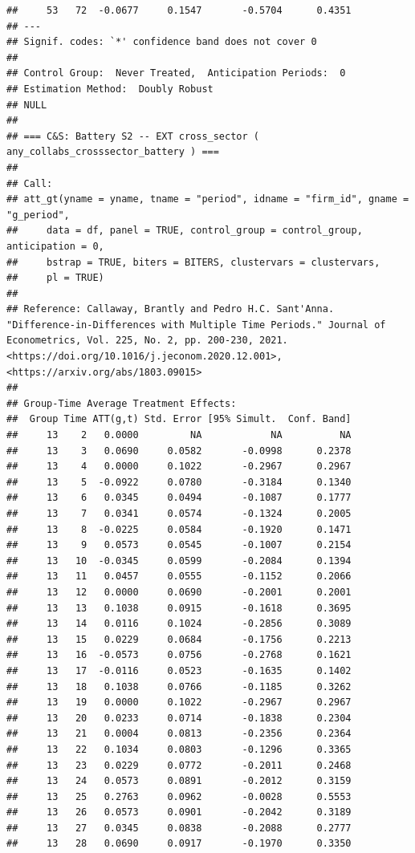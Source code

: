 \documentclass[
]{article}
\begin{document}
\begin{verbatim}
##     53   72  -0.0677     0.1547       -0.5704      0.4351  
## ---
## Signif. codes: `*' confidence band does not cover 0
## 
## Control Group:  Never Treated,  Anticipation Periods:  0
## Estimation Method:  Doubly Robust
## NULL
## 
## === C&S: Battery S2 -- EXT cross_sector ( any_collabs_crosssector_battery ) ===
## 
## Call:
## att_gt(yname = yname, tname = "period", idname = "firm_id", gname = "g_period", 
##     data = df, panel = TRUE, control_group = control_group, anticipation = 0, 
##     bstrap = TRUE, biters = BITERS, clustervars = clustervars, 
##     pl = TRUE)
## 
## Reference: Callaway, Brantly and Pedro H.C. Sant'Anna.  "Difference-in-Differences with Multiple Time Periods." Journal of Econometrics, Vol. 225, No. 2, pp. 200-230, 2021. <https://doi.org/10.1016/j.jeconom.2020.12.001>, <https://arxiv.org/abs/1803.09015> 
## 
## Group-Time Average Treatment Effects:
##  Group Time ATT(g,t) Std. Error [95% Simult.  Conf. Band]  
##     13    2   0.0000         NA            NA          NA  
##     13    3   0.0690     0.0582       -0.0998      0.2378  
##     13    4   0.0000     0.1022       -0.2967      0.2967  
##     13    5  -0.0922     0.0780       -0.3184      0.1340  
##     13    6   0.0345     0.0494       -0.1087      0.1777  
##     13    7   0.0341     0.0574       -0.1324      0.2005  
##     13    8  -0.0225     0.0584       -0.1920      0.1471  
##     13    9   0.0573     0.0545       -0.1007      0.2154  
##     13   10  -0.0345     0.0599       -0.2084      0.1394  
##     13   11   0.0457     0.0555       -0.1152      0.2066  
##     13   12   0.0000     0.0690       -0.2001      0.2001  
##     13   13   0.1038     0.0915       -0.1618      0.3695  
##     13   14   0.0116     0.1024       -0.2856      0.3089  
##     13   15   0.0229     0.0684       -0.1756      0.2213  
##     13   16  -0.0573     0.0756       -0.2768      0.1621  
##     13   17  -0.0116     0.0523       -0.1635      0.1402  
##     13   18   0.1038     0.0766       -0.1185      0.3262  
##     13   19   0.0000     0.1022       -0.2967      0.2967  
##     13   20   0.0233     0.0714       -0.1838      0.2304  
##     13   21   0.0004     0.0813       -0.2356      0.2364  
##     13   22   0.1034     0.0803       -0.1296      0.3365  
##     13   23   0.0229     0.0772       -0.2011      0.2468  
##     13   24   0.0573     0.0891       -0.2012      0.3159  
##     13   25   0.2763     0.0962       -0.0028      0.5553  
##     13   26   0.0573     0.0901       -0.2042      0.3189  
##     13   27   0.0345     0.0838       -0.2088      0.2777  
##     13   28   0.0690     0.0917       -0.1970      0.3350  

\end{verbatim}
\end{document}
